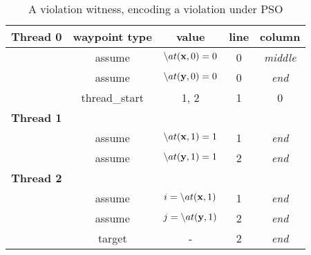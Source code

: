 \begin{table}[H]
\centering
\begin{tabular}{ccccc}
\textbf{Thread 0} & waypoint type & value & line & column \\\midrule
         & assume & $\backslash{}at(\mathbf{x}, 0) = 0$ & 0 & \emph{middle} \\
         & assume & $\backslash{}at(\mathbf{y}, 0) = 0$ & 0 & \emph{end} \\
         & thread\_start & 1, 2 & 1 & 0 \\
\textbf{Thread 1} & & &  &  \\\midrule
         & assume & $\backslash{}at(\mathbf{x}, 1) = 1$ & 1 & \emph{end} \\
         & assume & $\backslash{}at(\mathbf{y}, 1) = 1$ & 2 & \emph{end} \\
\textbf{Thread 2} & & &  &  \\\midrule
         & assume & $i = \backslash{}at(\mathbf{x}, 1)$ & 1 & \emph{end} \\
         & assume & $j = \backslash{}at(\mathbf{y}, 1)$ & 2 & \emph{end} \\
         & target & - & 2 & \emph{end} \\
\end{tabular}
\captionsetup{labelformat=empty}
\caption{A violation witness, encoding a violation under PSO}
\label{table:cex}
\end{table}